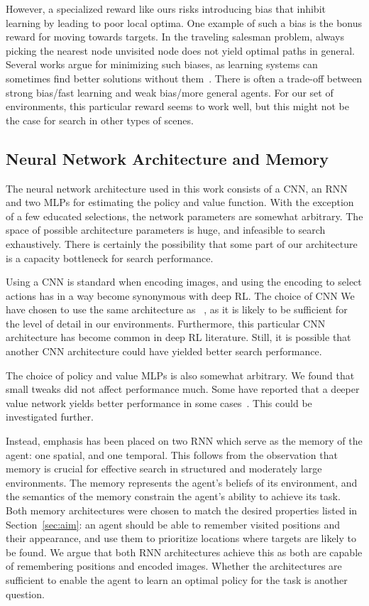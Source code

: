 However, a specialized reward like ours risks introducing bias that inhibit learning by leading to poor local optima.
One example of such a bias is the bonus reward for moving towards targets.
In the traveling salesman problem, always picking the nearest node unvisited node does not yield optimal paths in general.
Several works argue for minimizing such biases, as learning systems can sometimes find better solutions without them~\cite{hessel_inductive_2019}.
There is often a trade-off between strong bias/fast learning and weak bias/more general agents.
For our set of environments, this particular reward seems to work well, but this might not be the case for search in other types of scenes.

\subsection{Neural Network Architecture and Memory}

The neural network architecture used in this work consists of a CNN, an RNN and two MLPs for estimating the policy and value function.
With the exception of a few educated selections, the network parameters are somewhat arbitrary.
The space of possible architecture parameters is huge, and infeasible to search exhaustively.
There is certainly the possibility that some part of our architecture is a capacity bottleneck for search performance.

Using a CNN is standard when encoding images, and using the encoding to select actions has in a way become synonymous with deep RL.
The choice of CNN 
We have chosen to use the same architecture as ~\cite{mnih_playing_2013}, as it is likely to be sufficient for the level of detail in our environments.
Furthermore, this particular CNN architecture has become common in deep RL literature.
Still, it is possible that another CNN architecture could have yielded better search performance.

The choice of policy and value MLPs is also somewhat arbitrary.
We found that small tweaks did not affect performance much.
Some have reported that a deeper value network yields better performance in some cases~\cite{andrychowicz_what_2020}.
This could be investigated further.

Instead, emphasis has been placed on two RNN which serve as the memory of the agent: one spatial, and one temporal.
This follows from the observation that memory is crucial for effective search in structured and moderately large environments.
The memory represents the agent's beliefs of its environment, and the semantics of the memory constrain the agent's ability to achieve its task.
Both memory architectures were chosen to match the desired properties listed in Section~\ref{sec:aim}:
an agent should be able to remember visited positions and their appearance, and use them to prioritize locations where targets are likely to be found.
We argue that both RNN architectures achieve this as both are capable of remembering positions and encoded images.
Whether the architectures are sufficient to enable the agent to learn an optimal policy for the task is another question.

